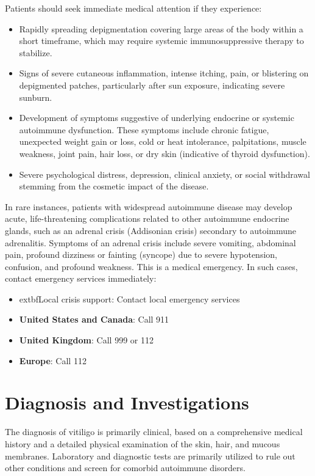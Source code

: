 Patients should seek immediate medical attention if they experience:
\begin{itemize}
    \item Rapidly spreading depigmentation covering large areas of the body within a short timeframe, which may require systemic immunosuppressive therapy to stabilize.
    \item Signs of severe cutaneous inflammation, intense itching, pain, or blistering on depigmented patches, particularly after sun exposure, indicating severe sunburn.
    \item Development of symptoms suggestive of underlying endocrine or systemic autoimmune dysfunction. These symptoms include chronic fatigue, unexpected weight gain or loss, cold or heat intolerance, palpitations, muscle weakness, joint pain, hair loss, or dry skin (indicative of thyroid dysfunction).
    \item Severe psychological distress, depression, clinical anxiety, or social withdrawal stemming from the cosmetic impact of the disease.
\end{itemize}

In rare instances, patients with widespread autoimmune disease may develop acute, life-threatening complications related to other autoimmune endocrine glands, such as an adrenal crisis (Addisonian crisis) secondary to autoimmune adrenalitis. Symptoms of an adrenal crisis include severe vomiting, abdominal pain, profound dizziness or fainting (syncope) due to severe hypotension, confusion, and profound weakness. This is a medical emergency. In such cases, contact emergency services immediately:
\begin{itemize}
    \item 	extbf{Local crisis support}: Contact local emergency services
    \item \textbf{United States and Canada}: Call 911
    \item \textbf{United Kingdom}: Call 999 or 112
    \item \textbf{Europe}: Call 112
\end{itemize}

\section*{Diagnosis and Investigations}
The diagnosis of vitiligo is primarily clinical, based on a comprehensive medical history and a detailed physical examination of the skin, hair, and mucous membranes. Laboratory and diagnostic tests are primarily utilized to rule out other conditions and screen for comorbid autoimmune disorders.

